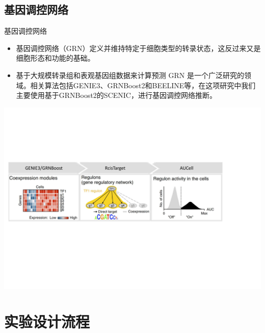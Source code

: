 \documentclass{beamer}
\begin{document}
\subsection{基因调控网络}

\begin{frame}{基因调控网络}
  \begin{itemize}
    \item 基因调控网络（GRN）定义并维持特定于细胞类型的转录状态，这反过来又是细胞形态和功能的基础。
    \item 基于大规模转录组和表观基因组数据来计算预测 GRN 是一个广泛研究的领域。相关算法包括GENIE3、GRNBoost2和BEELINE等，在这项研究中我们主要使用基于GRNBoost2的SCENIC，进行基因调控网络推断。
  \end{itemize}
  \center
  \includegraphics[width=0.8\linewidth]{figs/scenic-workflow.pdf}
\end{frame}

\section{实验设计流程}
\end{document}

